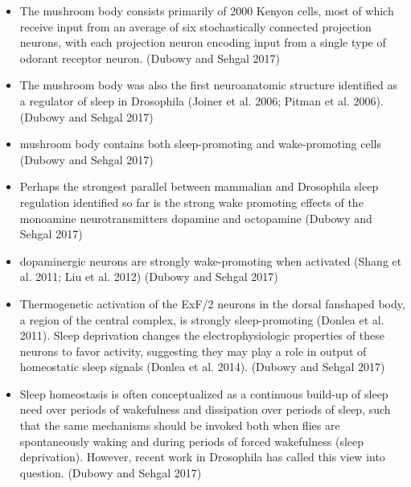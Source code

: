 \documentclass[11pt]{article}
\begin{document}
\begin{itemize}
    \item The mushroom body consists primarily of 2000 Kenyon cells, most of which receive input 
    from an average of six stochastically connected projection neurons, with each projection neuron 
    encoding input from a single type of odorant receptor neuron.
    \cite{dubowyCircadianRhythmsSleep2017} (Dubowy and Sehgal 2017)

    \item The mushroom body was also the first neuroanatomic structure identified as a regulator of
     sleep in Drosophila (Joiner et al. 2006; Pitman et al. 2006).
     \cite{dubowyCircadianRhythmsSleep2017} (Dubowy and Sehgal 2017)
    
    \item mushroom body contains both sleep-promoting and wake-promoting cells
    \cite{dubowyCircadianRhythmsSleep2017} (Dubowy and Sehgal 2017)
    
    \item Perhaps the strongest parallel between mammalian and Drosophila sleep regulation
    identified so far is the strong wake promoting effects of the monoamine neurotransmitters
    dopamine and octopamine
    \cite{dubowyCircadianRhythmsSleep2017} (Dubowy and Sehgal 2017)

    \item dopaminergic neurons are strongly wake-promoting when activated 
    (Shang et al. 2011; Liu et al. 2012)
    \cite{dubowyCircadianRhythmsSleep2017} (Dubowy and Sehgal 2017)

    \item Thermogenetic activation of the ExF/2 neurons in the dorsal fanshaped body, a 
    region of the central complex, is strongly sleep-promoting (Donlea et al. 2011). Sleep 
    deprivation changes the electrophysiologic properties of these neurons to favor activity,
    suggesting they may play a role in output of homeostatic sleep signals (Donlea et al. 2014).
    \cite{dubowyCircadianRhythmsSleep2017} (Dubowy and Sehgal 2017)

    \item Sleep homeostasis is often conceptualized as a continuous build-up of sleep need over
    periods of wakefulness and dissipation over periods of sleep, such that the same mechanisms
    should be invoked both when flies are spontaneously waking and during periods of forced 
    wakefulness (sleep deprivation). However, recent work in Drosophila has called this view 
    into question.
    \cite{dubowyCircadianRhythmsSleep2017} (Dubowy and Sehgal 2017)


\end{itemize}
\end{document}
